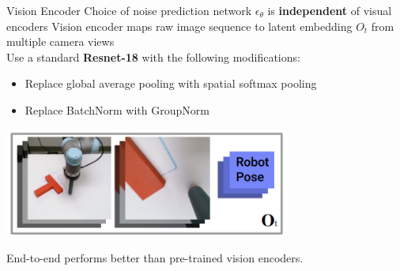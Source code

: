 \documentclass{beamer}
\begin{document}
\begin{frame}[t]{Vision Encoder}
    Choice of noise prediction network $\epsilon_\theta$ is \textbf{independent} of visual encoders
    Vision encoder maps raw image sequence to latent embedding $O_t$ from multiple camera views\\
    Use a standard \textbf{Resnet-18} with the following modifications:
    \begin{itemize}[label=-]
        \item Replace global average pooling with spatial softmax pooling
        \item Replace BatchNorm with GroupNorm
    \end{itemize}
    \begin{center}
        \includegraphics[width=0.7\textwidth]{./img/img_encoder.png}
    \end{center}
    End-to-end performs better than pre-trained vision encoders.
\end{frame}
\end{document}
